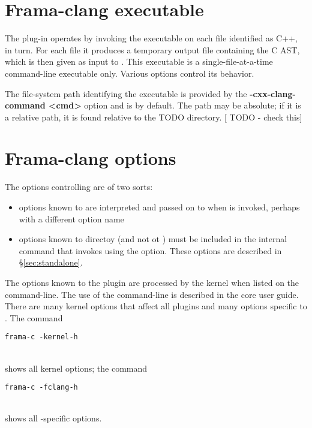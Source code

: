 \section{Frama-clang executable}
The plug-in operates by invoking the executable \irg
on each file identified as C++, in turn. 
For each file it produces a temporary output file containing the C AST, which is then given as input to \framac. 
This executable is a single-file-at-a-time command-line executable only. 
Various options control its behavior.

The file-system path identifying the executable is provided by the \textbf{-cxx-clang-command <cmd>}
option and is \irg by default. The path may be absolute; if it is a relative path, it is found relative to the TODO directory. [ TODO - check this]


\section{Frama-clang options}

The options controlling \fclang are of two sorts:
\begin{itemize}
\item options known to \framac are interpreted and passed on to \fclang when
\irg is invoked, perhaps with a different option name
\item options known to \fclang directoy (and not ot \framac) must be 
included in the internal command that invokes \irg using the  option. These options are described in \S\ref{sec:standalone}.
\end{itemize}

The options known to the \fcl plugin are processed by the \fc kernel when listed on the \fc command-line. 
The use of the \fc command-line is described in the core \fc 
user guide.
There are many kernel options that affect all plugins and many options specific to \fclang.
The command \\
\centerline{\lstinline|frama-c -kernel-h|} \\
shows all kernel options; the command\\
\centerline{\lstinline|frama-c -fclang-h|} \\
shows all \fcl-specific options.

